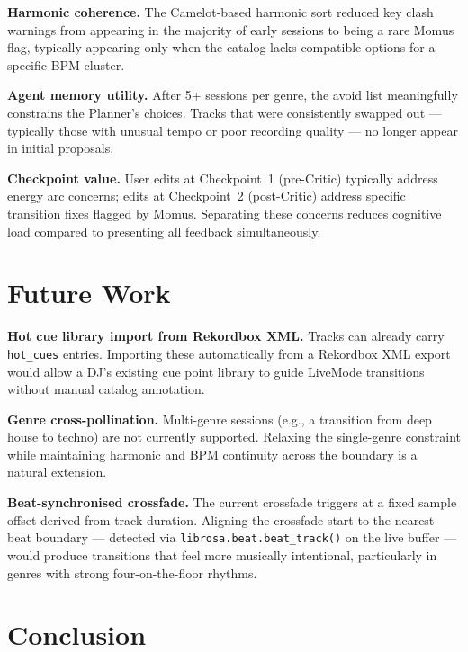 \documentclass[11pt,a4paper]{article}
\begin{document}
\textbf{Harmonic coherence.} The Camelot-based harmonic sort reduced key
clash warnings from appearing in the majority of early sessions to being a
rare Momus flag, typically appearing only when the catalog lacks compatible
options for a specific BPM cluster.

\textbf{Agent memory utility.} After 5+ sessions per genre, the avoid list
meaningfully constrains the Planner's choices. Tracks that were consistently
swapped out --- typically those with unusual tempo or poor recording quality
--- no longer appear in initial proposals.

\textbf{Checkpoint value.} User edits at Checkpoint~1 (pre-Critic) typically
address energy arc concerns; edits at Checkpoint~2 (post-Critic) address
specific transition fixes flagged by Momus. Separating these concerns reduces
cognitive load compared to presenting all feedback simultaneously.

\section{Future Work}

\textbf{Hot cue library import from Rekordbox XML.} Tracks can already carry
\texttt{hot\_cues} entries. Importing these automatically from a Rekordbox XML
export would allow a DJ's existing cue point library to guide LiveMode
transitions without manual catalog annotation.

\textbf{Genre cross-pollination.} Multi-genre sessions (e.g., a transition
from deep house to techno) are not currently supported. Relaxing the
single-genre constraint while maintaining harmonic and BPM continuity across
the boundary is a natural extension.

\textbf{Beat-synchronised crossfade.} The current crossfade triggers at a
fixed sample offset derived from track duration. Aligning the crossfade start
to the nearest beat boundary --- detected via \texttt{librosa.beat.beat\_track()}
on the live buffer --- would produce transitions that feel more musically
intentional, particularly in genres with strong four-on-the-floor rhythms.

\section{Conclusion}
\end{document}
